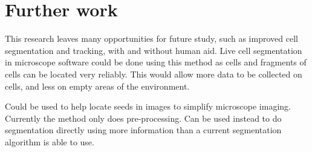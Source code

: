 \section{Further work}

This research leaves many opportunities for future study, such as improved cell segmentation and tracking, with and without human aid. Live cell segmentation in microscope software could be done using this method as cells and fragments of cells can be located very reliably. This would allow more data to be collected on cells, and less on empty areas of the environment.

Could be used to help locate seeds in images to simplify microscope imaging.
Currently the method only does pre-processing. Can be used instead to do segmentation directly using more information than a current segmentation algorithm is able to use.
